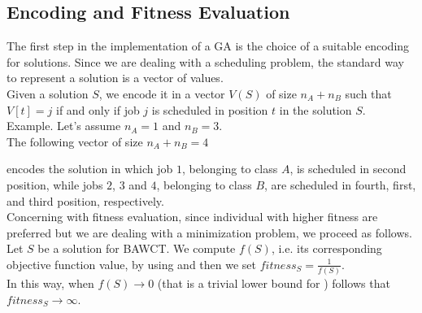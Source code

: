 \documentclass[opre,nonblindrev]{informs3} %
\begin{document}
\subsection{Encoding and Fitness Evaluation}
The first step in the implementation of a GA is the choice of a suitable encoding for solutions. Since we are dealing with a scheduling problem, the standard way to represent a solution is a vector of values.\\
Given a solution $S$, we encode it in a vector $V(S)$ of size $n_A+n_B$ such that $V[t] = j$ if and only if job $j$ is scheduled in position $t$ in the solution $S$.\\
Example.
Let's assume $n_A = 1$ and $n_B=3$.\\
The following vector of size $n_A+n_B=4$
\begin{center}
\end{center}
 encodes the solution in which job $1$, belonging to class $A$, is scheduled in second position, while jobs $2$, $3$ and $4$, belonging to class $B$, are scheduled in fourth, first, and third position, respectively.\\
 Concerning with fitness evaluation, since individual with higher fitness are preferred but we are dealing with a minimization problem, we proceed as follows.\\Let $S$ be a solution for BAWCT. We compute $f(S)$, i.e. its corresponding objective function value, by using  and then we set $fitness_S = \frac{1}{f(S)}$.\\ In this way, when $f(S) \rightarrow 0 $ (that is a trivial lower bound for ) follows that $fitness_S \rightarrow \infty$.
\end{document}
